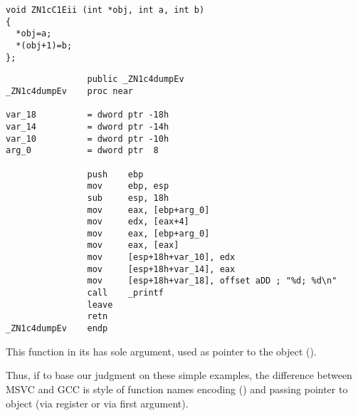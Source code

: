 \begin{lstlisting}
void ZN1cC1Eii (int *obj, int a, int b)
{
  *obj=a;
  *(obj+1)=b;
};
\end{lstlisting}



\begin{lstlisting}
                public _ZN1c4dumpEv
_ZN1c4dumpEv    proc near

var_18          = dword ptr -18h
var_14          = dword ptr -14h
var_10          = dword ptr -10h
arg_0           = dword ptr  8

                push    ebp
                mov     ebp, esp
                sub     esp, 18h
                mov     eax, [ebp+arg_0]
                mov     edx, [eax+4]
                mov     eax, [ebp+arg_0]
                mov     eax, [eax]
                mov     [esp+18h+var_10], edx
                mov     [esp+18h+var_14], eax
                mov     [esp+18h+var_18], offset aDD ; "%d; %d\n"
                call    _printf
                leave
                retn
_ZN1c4dumpEv    endp
\end{lstlisting}

{This function in its  has sole argument, 
used as pointer to the object ().}

{Thus, if to base our judgment on these simple examples, the difference between MSVC and GCC
is style of function names encoding () and passing pointer to object
(via \ECX register or via first argument).}
